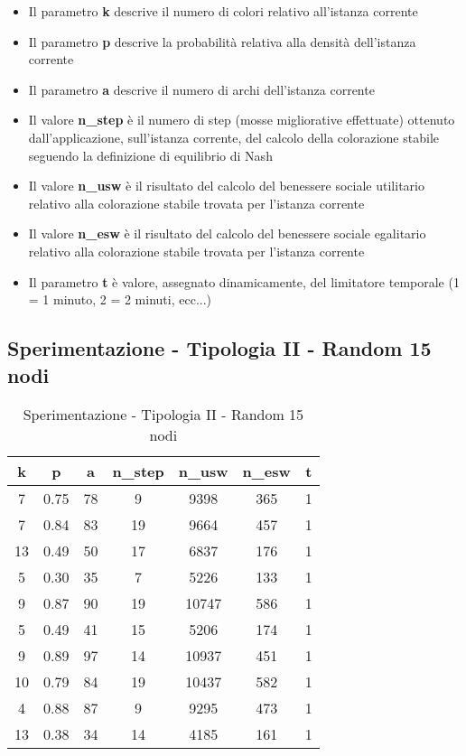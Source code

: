 \begin{itemize}
	\item Il parametro \textbf{k} descrive il numero di colori relativo all'istanza corrente
	\item Il parametro \textbf{p} descrive la probabilità relativa alla densità dell'istanza corrente
	\item Il parametro \textbf{a} descrive il numero di archi dell'istanza corrente
	\item Il valore \textbf{n\_step} è il numero di step (mosse migliorative effettuate) ottenuto dall'applicazione, sull'istanza corrente, del calcolo della colorazione stabile seguendo la definizione di equilibrio di Nash
	\item Il valore \textbf{n\_usw} è il risultato del calcolo del benessere sociale utilitario relativo alla colorazione stabile trovata per l'istanza corrente
	\item Il valore \textbf{n\_esw} è il risultato del calcolo del benessere sociale egalitario relativo alla colorazione stabile trovata per l'istanza corrente
	\item Il parametro \textbf{t} è valore, assegnato dinamicamente, del limitatore temporale (1 = 1 minuto, 2 = 2 minuti, ecc...)
\end{itemize}

\subsection{Sperimentazione - Tipologia II - Random 15 nodi}

\begin{table}[H]
\centering
\begin{tabular}{|c|c|c|c|c|c|c|}
\hline
\textbf{k} & \textbf{p} & \textbf{a} & \textbf{n\_step} & \textbf{n\_usw} & \textbf{n\_esw} & \textbf{t} \\ \hline
7 & 0.75 & 78 & 9 & 9398 & 365 & 1 \\ \hline
7 & 0.84 & 83 & 19 & 9664 & 457 & 1 \\ \hline
13 & 0.49 & 50 & 17 & 6837 & 176 & 1 \\ \hline
5 & 0.30 & 35 & 7 & 5226 & 133 & 1 \\ \hline
9 & 0.87 & 90 & 19 & 10747 & 586 & 1 \\ \hline
5 & 0.49 & 41 & 15 & 5206 & 174 & 1 \\ \hline
9 & 0.89 & 97 & 14 & 10937 & 451 & 1 \\ \hline
10 & 0.79 & 84 & 19 & 10437 & 582 & 1 \\ \hline
4 & 0.88 & 87 & 9 & 9295 & 473 & 1 \\ \hline
13 & 0.38 & 34 & 14 & 4185 & 161 & 1 \\ \hline
\end{tabular}
\caption{Sperimentazione - Tipologia II - Random 15 nodi}
\label{tab:sperimentazione-tipo1-15nodi}
\end{table}

